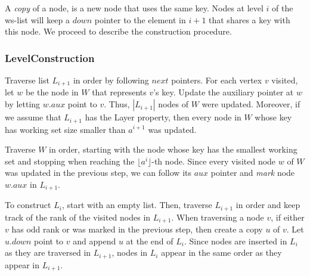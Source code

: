 \documentclass[11pt]{article}       %
\newcommand{\wlist}{ws-list\xspace}
\newcommand{\layer}{Layer property\xspace}
\begin{document}
A  \emph{copy} of a node, is a new node that uses the same key.
Nodes at level $i$ of the \wlist will keep a $down$ pointer to the element in $i+1$ that shares a key with this node.
We proceed to describe the construction procedure.

\subsubsection*{LevelConstruction}
Traverse list $L_{i+1}$ in order by following $next$ pointers. For each vertex $v$ visited, let $w$ be the node in $W$ that represents $v$'s key.
Update the auxiliary pointer at $w$ by letting $w.aux$ point to $v$. 
Thus, $|L_{i+1}|$ nodes of $W$ were updated. 
Moreover, if we assume that $L_{i+1}$ has the \layer, then every node in $W$ whose key has working set size smaller than $a^{i+1}$ was updated.

Traverse $W$ in order, starting with the node whose key has the smallest working set and stopping when reaching the $\lfloor a^i\rfloor$-th node. 
Since every visited node $w$ of $W$ was updated in the previous step, we can follow its $aux$ pointer and \emph{mark} node $w.aux$ in $L_{i+1}$. 

To construct $L_i$, start with an empty list. Then, traverse $L_{i+1}$ in order and keep track of the rank of the visited nodes in $L_{i+1}$.
When traversing a node $v$, if either $v$ has odd rank or was marked in the previous step, then create a copy $u$ of $v$.
Let $u.down$ point to $v$ and append $u$ at the end of $L_i$. 
Since nodes are inserted in $L_i$ as they are traversed in $L_{i+1}$, nodes in $L_i$ appear in the same order as they appear in $L_{i+1}$.\\
\end{document}
